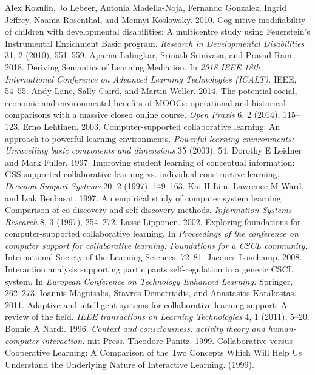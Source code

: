 \begin{multicols}{2}
\begin{thebibliography}{99}
 Alex Kozulin, Jo Lebeer, Antonia Madella-Noja, Fernando Gonzalez, Ingrid Jeffrey, Naama Rosenthal, and Mennyi Koslowsky. 2010. Cog-nitive modifiability of children with developmental disabilities: A multicentre study using Feuerstein’s Instrumental Enrichment Basic program. \textit{Research in Developmental Disabilities} 31, 2 (2010), 551–559.
 Aparna Lalingkar, Srinath Srinivasa, and Prasad Ram. 2018. Deriving Semantics of Learning Mediation. In \textit{2018 IEEE 18th International Conference on Advanced Learning Technologies (ICALT).} IEEE, 54–55.
 Andy Lane, Sally Caird, and Martin Weller. 2014. The potential social, economic and environmental benefits of MOOCs: operational and historical comparisons with a massive closed online course. \textit{Open Praxis} 6, 2 (2014), 115–123.
 Erno Lehtinen. 2003. Computer-supported collaborative learning: An approach to powerful learning environments. \textit{Powerful learning environments: Unravelling basic components and dimensions} 35 (2003), 54.
 Dorothy E Leidner and Mark Fuller. 1997. Improving student learning of conceptual information: GSS supported collaborative learning vs. individual constructive learning. \textit{Decision Support Systems} 20, 2 (1997), 149–163.
 Kai H Lim, Lawrence M Ward, and Izak Benbasat. 1997. An empirical study of computer system learning: Comparison of co-discovery and self-discovery methods. \textit{Information Systems Research} 8, 3 (1997), 254–272.
 Lasse Lipponen. 2002. Exploring foundations for computer-supported collaborative learning. In \textit{Proceedings of the conference on computer support for collaborative learning: Foundations for a CSCL community.} International Society of the Learning Sciences, 72–81.
 Jacques Lonchamp. 2008. Interaction analysis supporting participants self-regulation in a generic CSCL system. In \textit{European Conference on Technology Enhanced Learning.} Springer, 262–273.
 Ioannis Magnisalis, Stavros Demetriadis, and Anastasios Karakostas. 2011. Adaptive and intelligent systems for collaborative learning support: A review of the field. \textit{IEEE transactions on Learning Technologies} 4, 1 (2011), 5–20.
 Bonnie A Nardi. 1996. \textit{Context and consciousness: activity theory and human-computer interaction.} mit Press.
 Theodore Panitz. 1999. Collaborative versus Cooperative Learning: A Comparison of the Two Concepts Which Will Help Us Understand the Underlying Nature of Interactive Learning. (1999).

\end{thebibliography}
\end{multicols}
